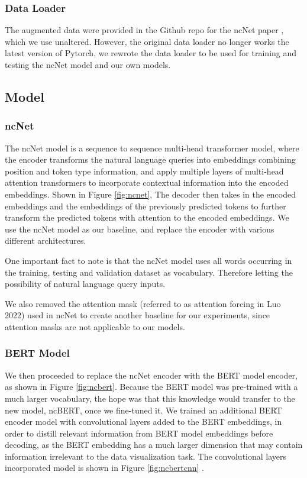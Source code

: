 \documentclass[
	a4paper, %
	10pt, %
	unnumberedsections, %
	twoside, %
]{t0003}
\begin{document}
\subsubsection{Data Loader} The augmented data were provided in the Github repo for the ncNet paper\cite{Luo:2022qr} , which we use unaltered. However, the original data loader no longer works the latest version of Pytorch, we rewrote the data loader to be used for training and testing the ncNet model and our own models.

\subsection{Model}

\subsubsection{ncNet} The ncNet\cite{Luo:2022qr} model is a sequence to sequence multi-head transformer model, where the encoder transforms the natural language queries into embeddings combining position and token type information, and apply multiple layers of multi-head attention transformers to incorporate contextual information into the encoded embeddings. Shown in Figure \ref{fig:ncnet}, The decoder then takes in the encoded embeddings and the embeddings of the previously predicted tokens to further transform the predicted tokens with attention to the encoded embeddings. We use the ncNet model as our baseline, and replace the encoder with various different architectures.

One important fact to note is that the ncNet model uses all words occurring in the training, testing and validation dataset as vocabulary. Therefore letting the possibility of natural language query inputs.

We also removed the attention mask (referred to as attention forcing in Luo 2022\cite{Luo:2022qr}) used in ncNet to create another baseline for our experiments, since attention masks are not applicable to our models.

\subsubsection{BERT Model} We then proceeded to replace the ncNet encoder with the BERT model encoder, as shown in Figure \ref{fig:ncbert}. Because the BERT model was pre-trained with a much larger vocabulary, the hope was that this knowledge would transfer to the new model, ncBERT, once we fine-tuned it. We trained an additional BERT encoder model with convolutional layers added to the BERT embeddings, in order to distill relevant information from BERT model embeddings before decoding, as the BERT embedding has a much larger dimension that may contain information irrelevant to the data visualization task. The convolutional layers incorporated model is shown in Figure \ref{fig:ncbertcnn} .
\end{document}
